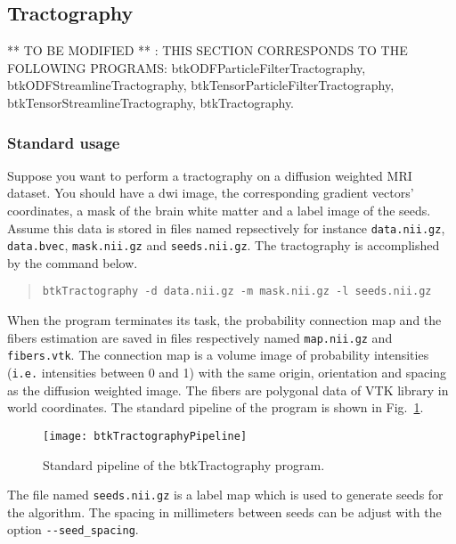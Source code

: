 \subsection{Tractography \cite{pontabry_probabilistic_2011}}
\label{subsec:tracto}

** TO BE MODIFIED ** : THIS SECTION CORRESPONDS TO THE FOLLOWING PROGRAMS: btkODFParticleFilterTractography, btkODFStreamlineTractography, btkTensorParticleFilterTractography, btkTensorStreamlineTractography, btkTractography.

    \subsubsection*{Standard usage}
        Suppose you want to perform a tractography on a diffusion weighted MRI 
dataset. You should have a dwi image, the corresponding gradient vectors'
coordinates, a mask of the brain white matter and a label image of the seeds.
Assume this data is stored in files named repsectively for instance
\texttt{data.nii.gz}, \texttt{data.bvec}, \texttt{mask.nii.gz} and
\texttt{seeds.nii.gz}. The tractography is accomplished by the command below.
            \begin{quote}
                \texttt{btkTractography -d data.nii.gz -m mask.nii.gz -l seeds.nii.gz}
            \end{quote}
        When the program terminates its task, the probability connection map and
        the fibers estimation are saved in files respectively named
\texttt{map.nii.gz} and \texttt{fibers.vtk}. The connection map is a volume
image of probability intensities (\texttt{i.e.} intensities between 0 and 1)
with the same origin, orientation and spacing as the diffusion weighted image.
The fibers are polygonal data of VTK library in world coordinates. The standard
pipeline of the program is shown in
Fig.~\ref{btkTractography-fig:standard-pipeline}.
            \begin{figure}
                \centering
                \texttt{[image: btkTractographyPipeline]}
                \caption{Standard pipeline of the btkTractography program.}
                \label{btkTractography-fig:standard-pipeline}
            \end{figure}

        The file named \texttt{seeds.nii.gz} is a label map which is used to 
        generate seeds for the algorithm. The spacing in millimeters between
seeds can be adjust with the option \texttt{-\hspace{0.1mm}-seed\_spacing}.

